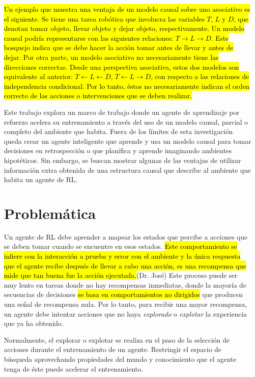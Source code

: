 \hl{Un ejemplo que muestra una ventaja de un modelo causal sobre uno asociativo es el siguiente.
Se tiene una tarea robótica que involucra las variables $T$, $L$ y $D$, que denotan tomar objeto, llevar objeto y
dejar objeto, respectivamente.
Un modelo causal podría representarse con las
siguientes relaciones: $T \rightarrow L \rightarrow D$.
Este bosquejo indica que se debe hacer la acción tomar antes de llevar y antes de
dejar. Por otra parte, un modelo asociativo no necesariamente tiene las direcciones
correctas. 
Desde una perspectiva asociativa, estos dos modelos son equivalente al anterior: $T \leftarrow L\leftarrow D$, $T\leftarrow L\rightarrow D$,
con respecto a las relaciones de independencia condicional.
Por lo tanto, éstos no necesariamente indican el orden correcto de las acciones o intervenciones que se deben
realizar.}

Este trabajo explora un marco de trabajo donde un agente
de aprendizaje por refuerzo acelera su entrenamiento a través
del uso de un modelo causal, parcial o completo del ambiente
que habita. Fuera de los límites de
esta investigación queda
crear un agente inteligente que aprende y usa un modelo causal para tomar decisiones en retrospección o que
planifica y aprende imaginando ambientes hipotéticos.
Sin embargo, se buscan mostrar algunas de las ventajas de utilizar información extra obtenida de una estructura causal que 
describe al ambiente que habita un agente de RL.


\section{Problemática}

Un agente de RL debe aprender a mapear los estados
que percibe a acciones que se deben tomar cuando
se encuentre en esos estados. \hl{Este comportamiento
se infiere con la interacción a prueba y error con el ambiente y la única respuesta que el agente recibe después de llevar a cabo una acción, es una recompensa que mide que tan buena fue la acción ejecutada.}(Dr. José)
Este proceso puede ser muy lento en tareas donde no hay recompensas inmediatas, donde la mayoría de secuencias
de decisiones \hl{se basa en comportamientos no dirigidos}
que producen una señal de recompensa nula.
Por lo tanto, para recibir una mayor recompensa, un agente debe intentar acciones que no haya \textit{explorado} o \textit{explotar} la experiencia que ya ha obtenido.

Normalmente, el explorar o explotar se realiza en el 
paso de la selección de acciones durante el entrenamiento de un agente. Restringir el espacio de búsqueda aprovechando 
propiedades del mundo y conocimiento que el agente tenga
de éste puede acelerar el entrenamiento.

